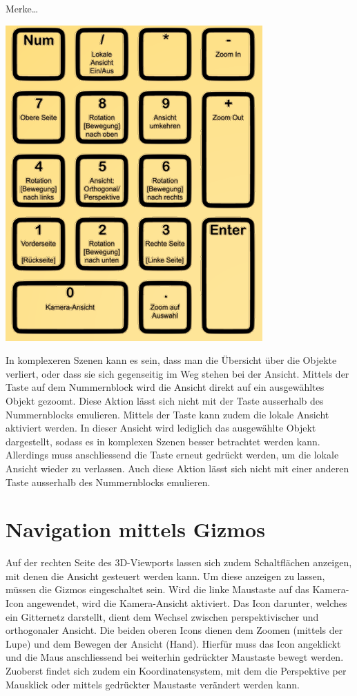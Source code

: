 \documentclass[
]{book}
\let\oldmarginnote\marginnote
\renewcommand{\marginnote}[1]{%
  \oldmarginnote{{\footnotesize\selectfont #1}}%
}
\newcommand{\kbd}[1]{\fbox{\texttt{#1}}}
\begin{document}
Merke\ldots{}

\includegraphics{Chapters/Images/Chapter_3/3_1_Number_Tabel.png}\hfill

\marginnote{Fokus auf ein Objekt}

In komplexeren Szenen kann es sein, dass man die Übersicht über die
Objekte verliert, oder dass sie sich gegenseitig im Weg stehen bei der
Ansicht. Mittels der Taste \kbd{.} auf dem Nummernblock wird die Ansicht
direkt auf ein ausgewähltes Objekt gezoomt. Diese Aktion lässt sich
nicht mit der Taste \kbd{.} ausserhalb des Nummernblocks emulieren.
Mittels der Taste \kbd{/} kann zudem die lokale Ansicht aktiviert
werden. In dieser Ansicht wird lediglich das ausgewählte Objekt
dargestellt, sodass es in komplexen Szenen besser betrachtet werden
kann. Allerdings muss anschliessend die Taste erneut gedrückt werden, um
die lokale Ansicht wieder zu verlassen. Auch diese Aktion lässt sich
nicht mit einer anderen Taste ausserhalb des Nummernblocks emulieren.

\section{Navigation mittels Gizmos}\label{navigation-mittels-gizmos}

Auf der rechten Seite des 3D-Viewports lassen sich zudem Schaltflächen
anzeigen, mit denen die Ansicht gesteuert werden kann. Um diese anzeigen
zu lassen, müssen die Gizmos eingeschaltet sein. Wird die linke
Maustaste auf das Kamera-Icon angewendet, wird die Kamera-Ansicht
aktiviert. Das Icon darunter, welches ein Gitternetz darstellt, dient
dem Wechsel zwischen perspektivischer und orthogonaler Ansicht. Die
beiden oberen Icons dienen dem Zoomen (mittels der Lupe) und dem Bewegen
der Ansicht (Hand). Hierfür muss das Icon angeklickt und die Maus
anschliessend bei weiterhin gedrückter Maustaste bewegt werden. Zuoberst
findet sich zudem ein Koordinatensystem, mit dem die Perspektive per
Mausklick oder mittels gedrückter Maustaste verändert werden kann.
\end{document}

